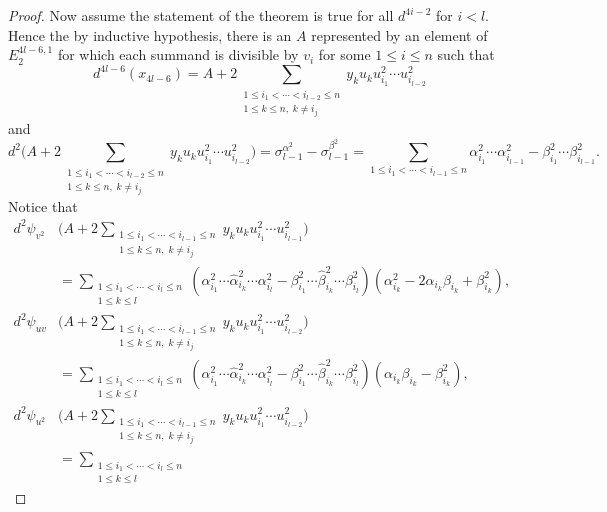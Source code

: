 \documentclass{article}
\theoremstyle{plain}
\theoremstyle{definition}
\numberwithin{thm}{section}
\begin{document}
\begin{proof}
			Now assume the statement of the theorem is true for all $d^{4i-2}$ for $i< l$.
			Hence the by inductive hypothesis, there is an $A$ represented by an element of $E_2^{4l-6,1}$ for which each summand is divisible by $v_i$ for some $1\leq i \leq n$
			such that
			\begin{equation*}
				d^{4l-6}(x_{4l-6})=A+2\sum_{\substack{1\leq i_1<\cdots<i_{l-2}\leq n \\ 1\leq k \leq n, \; k\neq i_j }}{y_{k}u_{k}u_{i_1}^2\cdots u_{i_{l-2}}^2}
			\end{equation*}
			and
			\begin{equation*}
				d^2\big(A+2\sum_{\substack{1\leq i_1<\cdots<i_{l-2}\leq n \\ 1\leq k \leq n, \; k\neq i_j }}{y_{k}u_{k}u_{i_1}^2\cdots u_{i_{l-2}}^2}\big)
				=\sigma_{l-1}^{\alpha^2}-\sigma_{l-1}^{\beta^2}
				=\sum_{1\leq i_1 <\cdots<i_{l-1}\leq n}{\alpha_{i_1}^2\cdots\alpha_{i_{l-1}}^2-\beta_{i_1}^2\cdots\beta_{i_{l-1}}^2}.
			\end{equation*}
			Notice that
			\begin{align}
				d^2\psi_{v^2}&(A+2\sum_{\substack{1\leq i_1<\cdots<i_{l-1}\leq n \\ 1\leq k \leq n, \; k\neq i_j }}{y_{k}u_{k}u_{i_1}^2\cdots u_{i_{l-1}}^2}\big) \nonumber \\ 
				&=\sum_{\substack{1\leq i_1<\cdots<i_{l}\leq n \\ 1\leq k \leq l}}
				{(\alpha_{i_1}^2\cdots\hat{\alpha}_{i_k}^2\cdots\alpha^2_{i_{l}}-\beta_{i_1}^2\cdots\hat{\beta}_{i_k}^2\cdots\beta^2_{i_{l}})
				(\alpha^2_{i_k}-2\alpha_{i_k}\beta_{i_k}+\beta^2_{i_k})} \label{eq:Psiv2}, \\
				d^2\psi_{uv}&(A+2\sum_{\substack{1\leq i_1<\cdots<i_{l-1}\leq n \\ 1\leq k \leq n, \; k\neq i_j }}{y_{k}u_{k}u_{i_1}^2\cdots u_{i_{l-2}}^2}\big) \nonumber \\ 
				&=\sum_{\substack{1\leq i_1<\cdots<i_{l}\leq n \\ 1\leq k \leq l}}
				{(\alpha_{i_1}^2\cdots\hat{\alpha}_{i_k}^2\cdots\alpha^2_{i_{l}}-\beta_{i_1}^2\cdots\hat{\beta}_{i_k}^2\cdots\beta^2_{i_{l}})
				(\alpha_{i_k}\beta_{i_k}-\beta^2_{i_k})} \label{eq:Psiuv}, \\
				d^2\psi_{u^2}&(A+2\sum_{\substack{1\leq i_1<\cdots<i_{l-1}\leq n \\ 1\leq k \leq n, \; k\neq i_j }}{y_{k}u_{k}u^2_{i_1}\cdots u_{i_{l-2}}^2}\big) \nonumber \\ 
				&=\sum_{\substack{1\leq i_1<\cdots<i_{l}\leq n \\ 1\leq k \leq l}} 

\end{align}
\end{proof}
\end{document}
